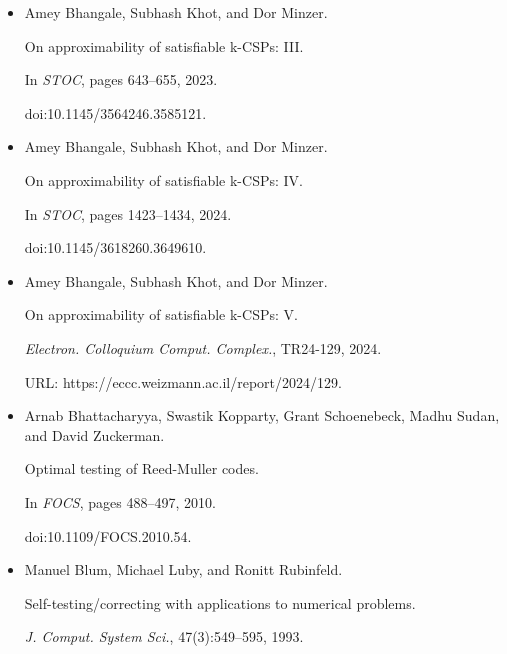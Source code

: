 \documentclass[10pt,a4paper]{article}
\begin{document}
\begin{itemize}
doi:10.1145/3564246.3585120.





\item[] 
[11]

Amey Bhangale, Subhash Khot, and Dor Minzer.


On approximability of satisfiable k-CSPs: III.


In \emph{STOC}, pages 643–655, 2023.


doi:10.1145/3564246.3585121.





\item[] 
[12]

Amey Bhangale, Subhash Khot, and Dor Minzer.


On approximability of satisfiable k-CSPs: IV.


In \emph{STOC}, pages 1423–1434, 2024.


doi:10.1145/3618260.3649610.





\item[] 
[13]

Amey Bhangale, Subhash Khot, and Dor Minzer.


On approximability of satisfiable k-CSPs: V.


\emph{Electron. Colloquium Comput. Complex.}, TR24-129, 2024.


URL: https://eccc.weizmann.ac.il/report/2024/129.





\item[] 
[14]

Arnab Bhattacharyya, Swastik Kopparty, Grant Schoenebeck, Madhu Sudan, and
David Zuckerman.


Optimal testing of Reed-Muller codes.


In \emph{FOCS}, pages 488–497, 2010.


doi:10.1109/FOCS.2010.54.





\item[] 
[15]

Manuel Blum, Michael Luby, and Ronitt Rubinfeld.


Self-testing/correcting with applications to numerical problems.


\emph{J. Comput. System Sci.}, 47(3):549–595, 1993.



\end{itemize}
\end{document}
